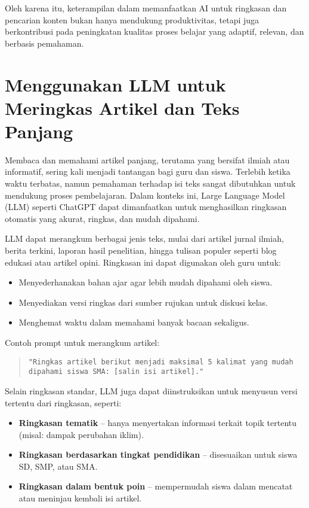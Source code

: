 Oleh karena itu, keterampilan dalam memanfaatkan AI untuk ringkasan dan pencarian konten bukan hanya mendukung produktivitas, tetapi juga berkontribusi pada peningkatan kualitas proses belajar yang adaptif, relevan, dan berbasis pemahaman.

\section{Menggunakan LLM untuk Meringkas Artikel dan Teks Panjang}

Membaca dan memahami artikel panjang, terutama yang bersifat ilmiah atau informatif, sering kali menjadi tantangan bagi guru dan siswa. Terlebih ketika waktu terbatas, namun pemahaman terhadap isi teks sangat dibutuhkan untuk mendukung proses pembelajaran. Dalam konteks ini, Large Language Model (LLM) seperti ChatGPT dapat dimanfaatkan untuk menghasilkan ringkasan otomatis yang akurat, ringkas, dan mudah dipahami.

LLM dapat merangkum berbagai jenis teks, mulai dari artikel jurnal ilmiah, berita terkini, laporan hasil penelitian, hingga tulisan populer seperti blog edukasi atau artikel opini. Ringkasan ini dapat digunakan oleh guru untuk:
\begin{itemize}
	\item Menyederhanakan bahan ajar agar lebih mudah dipahami oleh siswa.
	\item Menyediakan versi ringkas dari sumber rujukan untuk diskusi kelas.
	\item Menghemat waktu dalam memahami banyak bacaan sekaligus.
\end{itemize}

Contoh prompt untuk merangkum artikel:
\begin{quote}\centering
	\texttt{"Ringkas artikel berikut menjadi maksimal 5 kalimat yang mudah dipahami siswa SMA: [salin isi artikel]."}
\end{quote}

Selain ringkasan standar, LLM juga dapat diinstruksikan untuk menyusun versi tertentu dari ringkasan, seperti:
\begin{itemize}
	\item \textbf{Ringkasan tematik} – hanya menyertakan informasi terkait topik tertentu (misal: dampak perubahan iklim).
	\item \textbf{Ringkasan berdasarkan tingkat pendidikan} – disesuaikan untuk siswa SD, SMP, atau SMA.
	\item \textbf{Ringkasan dalam bentuk poin} – mempermudah siswa dalam mencatat atau meninjau kembali isi artikel.
\end{itemize}

